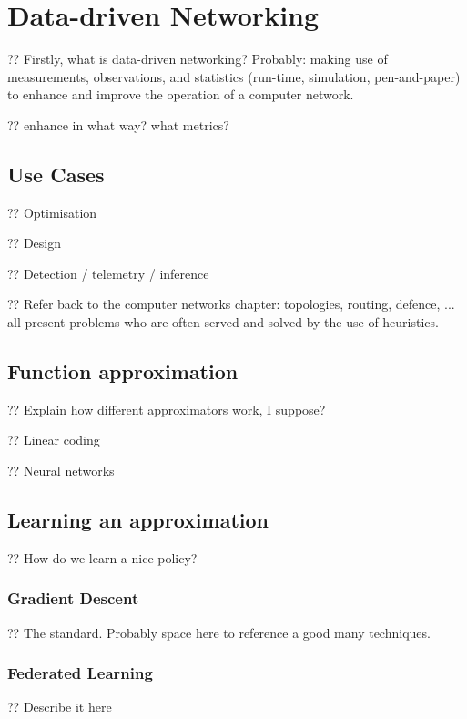 
\chapter{Data-driven Networking}

?? Firstly, what is data-driven networking? Probably: making use of measurements, observations, and statistics (run-time, simulation, pen-and-paper) to enhance and improve the operation of a computer network.

?? enhance in what way? what metrics?

\section{Use Cases}

?? Optimisation

?? Design

?? Detection / telemetry / inference

?? Refer back to the computer networks chapter: topologies, routing, defence, ... all present problems who are often served and solved by the use of heuristics.

\section{Function approximation}

?? Explain how different approximators work, I suppose?

?? Linear coding

?? Neural networks

\section{Learning an approximation}

?? How do we learn a nice policy?

\subsection{Gradient Descent}

?? The standard. Probably space here to reference a good many techniques.

\subsection{Federated Learning}

?? Describe it here

